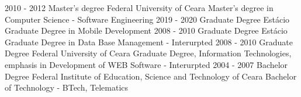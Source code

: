 \begin{entrylist}
    \entry
        {2010 - 2012}
        {Master's degree}
        {Federal University of Ceara}
        {Master's degree in Computer Science - Software Engineering}
    \entry
        {2019 - 2020}
        {Graduate Degree}
        {Estácio}
        {Graduate Degree in Mobile Development}
    \entry
        {2008 - 2010}
        {Graduate Degree}
        {Estácio}
        {Graduate Degree in Data Base Management - Interurpted}
    \entry
        {2008 - 2010}
        {Graduate Degree}
        {Federal University of Ceara}
        {Graduate Degree, Information Technologies, emphasis in Development of WEB Software - Interurpted}
    \entry
        {2004 - 2007}
        {Bachelor Degree}
        {Federal Institute of Education, Science and Technology of Ceara}
        {Bachelor of Technology - BTech, Telematics}
\end{entrylist}